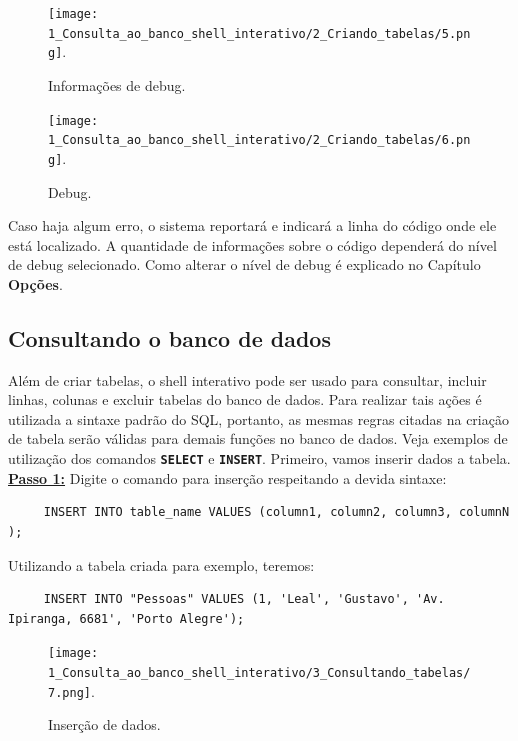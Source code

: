 \documentclass[9pt]{report}
\begin{document}
{    \begin{figure}[H]
      \texttt{[image: 1\_Consulta\_ao\_banco\_shell\_interativo/2\_Criando\_tabelas/5.png]}.
      \caption{ Informações de debug.}
      \label{fig:infodebug}
    \end{figure}

    
    \begin{figure}[H]
      \texttt{[image: 1\_Consulta\_ao\_banco\_shell\_interativo/2\_Criando\_tabelas/6.png]}.      
      \caption{Debug.}
      \label{fig:Debug}
    \end{figure}

    Caso haja algum erro, o sistema reportará e indicará a linha
    do código onde ele está localizado. A quantidade de
    informações sobre o código dependerá do nível de debug
    selecionado. Como alterar o nível de debug é explicado
    no Capítulo \textbf{Opções}.

    \subsection{Consultando o banco de dados}

    Além de criar tabelas, o shell interativo pode ser usado
    para consultar, incluir linhas, colunas e excluir tabelas
    do banco de dados. Para realizar tais ações é utilizada a
    sintaxe padrão do SQL, portanto, as mesmas regras citadas
    na criação de tabela serão válidas para demais funções no
    banco de dados. Veja exemplos de utilização dos comandos
    \texttt{\textbf{SELECT}} e \texttt{\textbf{INSERT}}.
    Primeiro, vamos inserir dados a tabela.
     \\
    
    \underline{\textbf{Passo 1:}}  Digite o comando para inserção
    respeitando a devida sintaxe:

   \begin{lstlisting}
     INSERT INTO table_name VALUES (column1, column2, column3, columnN );
   \end{lstlisting}
   
   Utilizando a tabela criada para exemplo, teremos:
   
   \begin{lstlisting}
     INSERT INTO "Pessoas" VALUES (1, 'Leal', 'Gustavo', 'Av. Ipiranga, 6681', 'Porto Alegre');
   \end{lstlisting}

   \begin{figure}[H]
      \texttt{[image: 1\_Consulta\_ao\_banco\_shell\_interativo/3\_Consultando\_tabelas/7.png]}.
      \caption{Inserção de dados.}
      \label{fig:inserindoDados}
   \end{figure}

}
\end{document}
